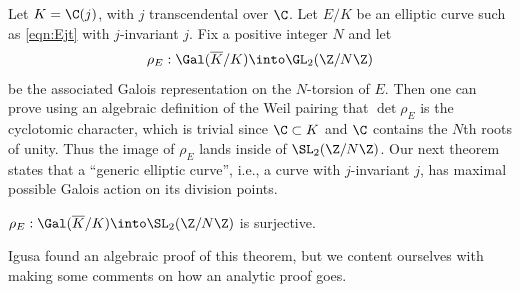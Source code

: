 \documentclass{report}
\begin{document}
Let $K=\C(j)$, with $j$ transcendental over $\C$. Let $E/K$ be an
elliptic curve such as \eqref{eqn:Ejt} with $j$-invariant $j$. Fix a
positive integer $N$ and let
$$\rho_E:\Gal(\overline{K}/K)\into\GL_2(\Z/N\Z)$$ be the
associated Galois representation on the $N$-torsion of $E$.  Then
one can prove using an algebraic definition of the Weil pairing that
$\det\rho_E$ is the cyclotomic character, which is trivial since $\C
\subset K$ and $\C$ contains the $N$th roots of unity.  Thus the image
of $\rho_E$ lands inside of $\SL_2(\Z/N\Z)$. Our next theorem states
that a ``generic elliptic curve'', i.e., a curve with $j$-invariant
$j$, has maximal possible Galois action on its division points.
\begin{theorem}
$\rho_E:\Gal(\overline{K}/K)\into\SL_2(\Z/N\Z)$ is surjective.
\end{theorem}
Igusa \cite{igusa:fibre} 
found an algebraic proof of this theorem,
but we content ourselves with
making some comments on how an analytic proof goes.
\end{document}
